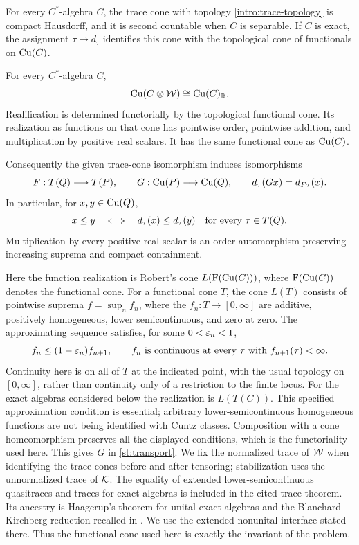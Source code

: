 \begin{theorem}\label{st:realification}
For every \(C^*\)-algebra \(C\), the trace cone with topology
\eqref{intro:trace-topology} is compact Hausdorff, and it is second
countable when \(C\) is separable. If \(C\) is exact, the assignment
\(\tau\mapsto d_\tau\) identifies this cone with the topological
cone of functionals on \(\operatorname{Cu}(C)\).

For every \(C^*\)-algebra \(C\),
\[
 \operatorname{Cu}(C\otimes\mathcal W)\cong\operatorname{Cu}(C)_{\mathbb R}.
\]
Realification is determined functorially by the topological functional
cone. Its realization as functions on that cone has pointwise order,
pointwise addition, and multiplication by positive real scalars.
It has the same functional cone as \(\operatorname{Cu}(C)\).

Consequently the given trace-cone isomorphism induces isomorphisms
\begin{equation}\label{st:transport}
 F:T(Q)\longrightarrow T(P),\qquad
 G:\operatorname{Cu}(P)\longrightarrow\operatorname{Cu}(Q),\qquad
 d_\tau(Gx)=d_{F\tau}(x).
\end{equation}
In particular, for \(x,y\in\operatorname{Cu}(Q)\),
\begin{equation}\label{st:pointwise-order}
 x\leq y
 \quad\Longleftrightarrow\quad
 d_\tau(x)\leq d_\tau(y)\quad\hbox{for every }\tau\in T(Q).
\end{equation}
Multiplication by every positive real scalar is an order automorphism
preserving increasing suprema and compact containment.
\end{theorem}

Here the function realization is Robert's cone
\(L(\operatorname{F}(\operatorname{Cu}(C)))\), where
\(\operatorname{F}(\operatorname{Cu}(C))\) denotes the functional cone. For a
functional cone \(T\), the cone \(L(T)\) consists of pointwise suprema
\(f=\sup_n f_n\), where the \(f_n:T\to[0,\infty]\) are additive,
positively homogeneous, lower semicontinuous, and zero at zero.
The approximating sequence satisfies, for some \(0<\varepsilon_n<1\),
\[
 f_n\leq(1-\varepsilon_n)f_{n+1},
 \qquad f_n\text{ is continuous at every }\tau\text{ with }f_{n+1}(\tau)<\infty.
\]
Continuity here is on all of \(T\) at the indicated point, with the
usual topology on \([0,\infty]\), rather than continuity only of a
restriction to the finite locus.
For the exact algebras considered below the realization is \(L(T(C))\).
This specified approximation condition is essential; arbitrary
lower-semicontinuous homogeneous functions are not being identified
with Cuntz classes. Composition with a cone homeomorphism preserves
all the displayed conditions, which is the functoriality used here. This gives \(G\) in
\eqref{st:transport}. We fix the normalized trace of \(\mathcal W\) when
identifying the trace cones before and after tensoring; stabilization
uses the unnormalized trace of \(\mathcal K\).
The equality of extended lower-semicontinuous quasitraces and traces
for exact algebras is included in the cited trace theorem. Its ancestry
is Haagerup's theorem for unital exact algebras
\cite[Theorem~5.11]{Haagerup} and the Blanchard--Kirchberg reduction
recalled in \cite[Remark~4.3]{ERS}. We use the extended nonunital
interface stated there. Thus the functional cone used here is exactly
the invariant of the problem.

